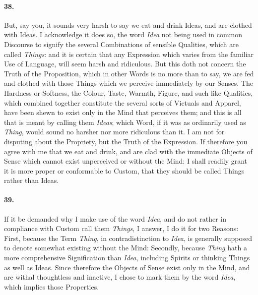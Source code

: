 \documentclass[]{article}
\newenvironment{sectionbody}{}{}
\begin{document}
\begin{sectionbody}
\paragraph{38.} But, say you, it sounds very harsh to say we eat and drink Ideas,
and are clothed with Ideas.  I acknowledge it does so, the word
\emph{Idea} not being used in common Discourse to signify the
several Combinations of sensible Qualities, which are called
\emph{Things}: and it is certain that any Expression which
varies from the familiar Use of Language, will seem harsh and
ridiculous.  But this doth not concern the Truth of the
Proposition, which in other Words is no more than to say, we are
fed and clothed with those Things which we perceive immediately
by our Senses.  The Hardness or Softness, the Colour, Taste,
Warmth, Figure, and such like Qualities, which combined together
constitute the several sorts of Victuals and Apparel, have been
shewn to exist only in the Mind that perceives them; and this is
all that is meant by calling them \emph{Ideas}; which Word, if
it was as ordinarily used as \emph{Thing}, would sound no
harsher nor more ridiculous than it.  I am not for disputing
about the Propriety, but the Truth of the Expression.  If
therefore you agree with me that we eat and drink, and are clad
with the immediate Objects of Sense which cannot exist
unperceived or without the Mind: I shall readily grant it is more
proper or conformable to Custom, that they should be called
Things rather than Ideas.



\paragraph{39.} If it be demanded why I make use of the word \emph{Idea}, and
do not rather in compliance with Custom call them
\emph{Things}, I answer, I do it for two Reasons: First,
because the Term \emph{Thing}, in contradistinction to
\emph{Idea}, is generally supposed to denote somewhat existing
without the Mind: Secondly, because \emph{Thing} hath a more
comprehensive Signification than \emph{Idea}, including Spirits
or thinking Things as well as Ideas.  Since therefore the Objects
of Sense exist only in the Mind, and are withal thoughtless and
inactive, I chose to mark them by the word \emph{Idea}, which
implies those Properties.




\end{sectionbody}
\end{document}
